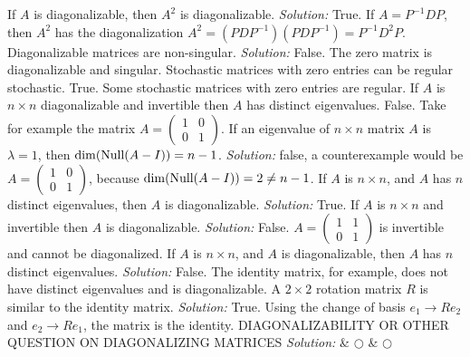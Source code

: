 \fi        
\ifnum {} 
   If $A$ is diagonalizable, then $A^2$ is diagonalizable. 
    \ifnum {} {\color{DarkBlue} \textit{Solution:  } True. If $A= P^{-1}DP$, then $A^2$ has the diagonalization $A^2 =(PDP^{-1})(PDP^{-1}) = P^{-1}D^2 P$. } \fi
\fi     
\ifnum {}
  Diagonalizable matrices are non-singular.  
    \ifnum {} {\color{DarkBlue} \textit{Solution:  } False. The zero matrix is diagonalizable and singular.  } \fi
\fi     
\ifnum {}
    Stochastic matrices with zero entries can be regular stochastic.  
    \ifnum {} {\color{DarkBlue} True. Some stochastic matrices with zero entries are regular.  } \fi
\fi     
\ifnum {}
    If $A$ is $n\times n$ diagonalizable and invertible then $A$ has distinct eigenvalues.
    \ifnum {} {\color{DarkBlue} False. Take for example the matrix $A = \begin{pmatrix} 1&0\\0&1\end{pmatrix}$. } \fi
\fi
\ifnum {}
        If an eigenvalue of $n\times n$ matrix $A$ is $\lambda = 1$, then $\dim(\text{Null}(A - I)) = n-1$.    
        \ifnum {} {\color{DarkBlue} \textit{Solution: } false, a counterexample would be \setlength{\extrarowheight}{0.0cm} $A = \begin{pmatrix}1&0\\0&1 \end{pmatrix}$, because $\dim(\text{Null}(A - I)) = 2 \ne n -1$. } \fi
\fi     
\ifnum {}
     If $A$ is $n\times n$, and $A$ has $n$ distinct eigenvalues, then $A$ is diagonalizable. 
    \ifnum {} {\color{DarkBlue} \textit{Solution:} True.   } \fi
\fi   
\ifnum {}
    If $A$ is $n\times n$ and invertible then $A$ is diagonalizable.
    \ifnum {} {\color{DarkBlue} \textit{Solution:  } False. \setlength{\extrarowheight}{0.0cm} $A = \begin{pmatrix} 1&1\\0&1\end{pmatrix}$ is invertible and cannot be diagonalized.  } \fi
\fi   
\ifnum {}
    If $A$ is $n\times n$, and $A$ is diagonalizable, then $A$ has $n$ distinct eigenvalues. 
    \ifnum {} {\color{DarkBlue} \textit{Solution:  } False. The identity matrix, for example, does not have distinct eigenvalues and is diagonalizable. } \fi
\fi   
\ifnum {}
     A $2 \times 2$ rotation matrix $R$ is similar to the identity matrix. 
    \ifnum {} {\color{DarkBlue} \textit{Solution:  } True. 
    Using the change of basis $e_1 \to R e_2$ and $e_2\to R e_1$, the matrix is the identity. }  \fi
\fi   
\ifnum {}
    DIAGONALIZABILITY OR OTHER QUESTION ON DIAGONALIZING MATRICES
    \ifnum {} {\color{DarkBlue} \textit{Solution:  }  } \fi
\fi   
& $\bigcirc$  & $\bigcirc$ \\   